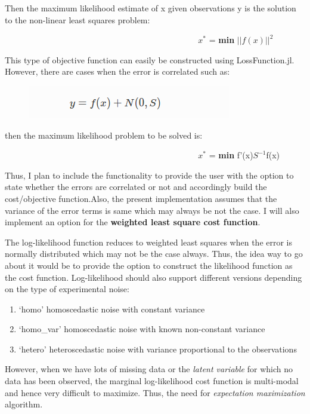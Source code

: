 \documentclass[11pt]{article}
\makeatletter
\def\maxwidth{\ifdim\Gin@nat@width>\linewidth\linewidth
    \else\Gin@nat@width\fi}
\let\Oldincludegraphics\includegraphics
\renewcommand{\includegraphics}[1]{\Oldincludegraphics[width=.8\maxwidth]{#1}}
\providecommand{\tightlist}{%
      \setlength{\itemsep}{0pt}\setlength{\parskip}{0pt}}
\makeatother
\begin{document}
    Then the maximum likelihood estimate of x given observations y is the
solution to the non-linear least squares problem:

~~~~~~~~~~ ~~~~~~~~~~~~~~~~~~~~~~~~~~~~~~~~~~~ \(x^{*}\) = \textbf{min}
\(||f(x)||^{2}\)

    This type of objective function can easily be constructed using
LossFunction.jl. However, there are cases when the error is correlated
such as:

    \begin{figure}[htbp]
\centering
\includegraphics{images/Maximum_Likelihood_covariance_.png}
\caption{}
\end{figure}

    then the maximum likelihood problem to be solved is:

~~~~~~~~~~ ~~~~~~~~~~~~~~~~~~~~~~~~~~~~~~~~~~~ \(x^{*}\) = \textbf{min}
f'(x)\(S^{-1}\)f(x)

    Thus, I plan to include the functionality to provide the user with the
option to state whether the errors are correlated or not and accordingly
build the cost/objective function.Also, the present implementation
assumes that the variance of the error terms is same which may always be
not the case. I will also implement an option for the \textbf{weighted
least square cost function}.

The log-likelihood function reduces to weighted least squares when the
error is normally distributed which may not be the case always. Thus,
the idea way to go about it would be to provide the option to construct
the likelihood function as the cost function. Log-likelihood should also
support different versions depending on the type of experimental noise:

\begin{enumerate}
\def\labelenumi{\arabic{enumi}.}
\tightlist
\item
  `homo' homoscedastic noise with constant variance\\
\item
  `homo\_var' homoscedastic noise with known non-constant variance
\item
  `hetero' heteroscedastic noise with variance proportional to the
  observations
\end{enumerate}

However, when we have lots of missing data or the \emph{latent variable}
for which no data has been observed, the marginal log-likelihood cost
function is multi-modal and hence very difficult to maximize. Thus, the
need for \emph{expectation maximization} algorithm.
\end{document}
